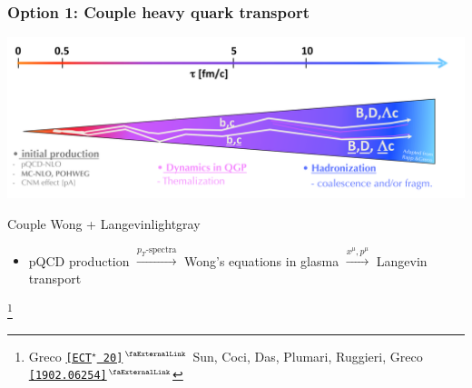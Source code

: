 \documentclass[aspectratio=169,11pt,usenames,dvipsnames]{beamer}
\renewcommand{\thefootnote}{\color{customblue}\faPaperPlaneO}
\newcommand\blfootnote[1]{%
  \begingroup
  \renewcommand\thefootnote{}\footnote{#1}%
  \addtocounter{footnote}{-1}%
  \endgroup
}
\begin{document}
\begin{frame}
    \frametitle{{\normalsize\color{jyured}\bfseries\sffamily Option 1: }Couple heavy quark transport}
    \vspace{-10pt}
    \begin{center}
        \includegraphics[width=0.7\paperwidth]{images/Greco-HF-Theory-HP2020-v-5_edit.png}
    \end{center}

   \begin{center}
    \begin{custombox2}{Couple Wong + Langevin}{lightgray}
        \small
        \begin{varwidth}{0.89\textwidth}
        \begin{itemize}\itemsep0em 
            \item pQCD production $\xrightarrow{p_T\text{-spectra}}$ Wong's equations in glasma $\xrightarrow{x^\mu, p^\mu}$ Langevin transport
        \end{itemize}
        \end{varwidth}
    \end{custombox2}

   \end{center} 
    \blfootnote{\scriptsize Greco \href{https://indico.ectstar.eu/event/40/contributions/1055/attachments/745/968/Greco-transport-ECT.pdf}{{\color{jyured}\texttt{[ECT$^\star$ 20]}$^\text{\scalebox{0.9}{\faExternalLink}}$}} Sun, Coci, Das, Plumari, Ruggieri, Greco \href{https://arxiv.org/abs/1902.06254}{{\color{jyured}\texttt{[1902.06254]$^\text{\scalebox{0.9}{\faExternalLink}}$}}}}
\end{frame}
\end{document}
